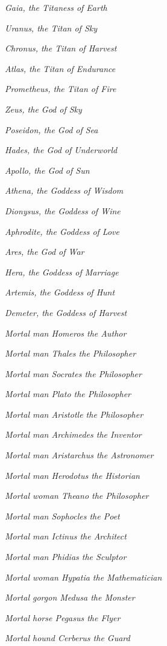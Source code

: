 \documentclass[a4paper]{article}
\begin{document}
\begin{itemize*}
    \item \textit{Gaia, the Titaness of Earth}
    \item \textit{Uranus, the Titan of Sky}
    \item \textit{Chronus, the Titan of Harvest}
    \item \textit{Atlas, the Titan of Endurance}
    \item \textit{Prometheus, the Titan of Fire}\\

    \item \textit{Zeus, the God of Sky}
    \item \textit{Poseidon, the God of Sea}
    \item \textit{Hades, the God of Underworld}
    \item \textit{Apollo, the God of Sun}
    \item \textit{Athena, the Goddess of Wisdom}
    \item \textit{Dionysus, the Goddess of Wine}
    \item \textit{Aphrodite, the Goddess of Love}
    \item \textit{Ares, the God of War}
    \item \textit{Hera, the Goddess of Marriage}
    \item \textit{Artemis, the Goddess of Hunt}
    \item \textit{Demeter, the Goddess of Harvest}\\
    
    \item \textit{Mortal man Homeros the Author}
    \item \textit{Mortal man Thales the Philosopher}
    \item \textit{Mortal man Socrates the Philosopher}
    \item \textit{Mortal man Plato the Philosopher}
    \item \textit{Mortal man Aristotle the Philosopher}
    \item \textit{Mortal man Archimedes the Inventor}
    \item \textit{Mortal man Aristarchus the Astronomer}
    \item \textit{Mortal man Herodotus the Historian}
    \item \textit{Mortal woman Theano the Philosopher}
    \item \textit{Mortal man Sophocles the Poet}
    \item \textit{Mortal man Ictinus the Architect}
    \item \textit{Mortal man Phidias the Sculptor}
    \item \textit{Mortal woman Hypatia the Mathematician}\\
    
    \item \textit{Mortal gorgon Medusa the Monster}
    \item \textit{Mortal horse Pegasus the Flyer}
    \item \textit{Mortal hound Cerberus the Guard}
\end{itemize*}
\end{document}
